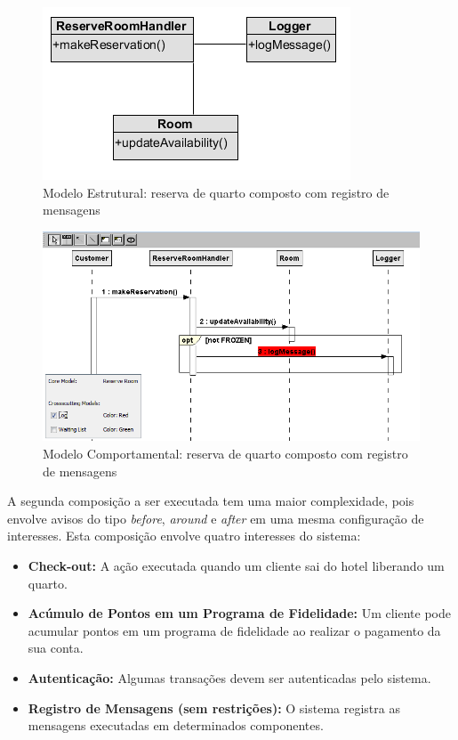   \begin{figure}[!h]
	\centering
	\includegraphics{img/case_study_compound_1_structural.png}
	\caption{Modelo Estrutural: reserva de quarto composto com registro de mensagens}\label{fig:case_study_compound_1_structural}
  \end{figure}

  \begin{figure}[!h]
	\centering
	\includegraphics[scale=0.7]{img/case_study_compound_1.png}
	\caption{Modelo Comportamental: reserva de quarto composto com registro de mensagens}\label{fig:case_study_compound_1}
  \end{figure}

A segunda composição a ser executada tem uma maior complexidade, pois envolve avisos do tipo \textit{before}, \textit{around} e \textit{after} em uma
mesma configuração de interesses. Esta composição envolve quatro interesses do sistema:

\begin{itemize}
  \item \textbf{Check-out:} A ação executada quando um cliente sai do hotel liberando um quarto.
  \item \textbf{Acúmulo de Pontos em um Programa de Fidelidade:} Um cliente pode acumular pontos em um programa de fidelidade ao realizar o pagamento
  da sua conta.
  \item \textbf{Autenticação:} Algumas transações devem ser autenticadas pelo sistema.
  \item \textbf{Registro de Mensagens (sem restrições):} O sistema registra as mensagens executadas em determinados componentes.
\end{itemize}

